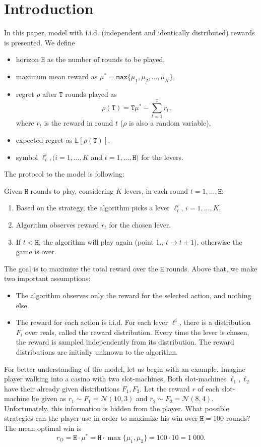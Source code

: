 \documentclass[11pt,american,czech]{article}
\newcommand{\T}{\mathtt{T}} %
\begin{document}
	\section*{Introduction}
	In this paper, model with i.i.d. (independent and identically distributed) rewards is presented. We define
	\begin{itemize}
		\item horizon $\mathtt{H}$ as the number of rounds to be played,
		\item maximum mean reward as $\mu^* = \mathtt{max}\{\mu_1,\mu_2,\dots,\mu_K\},$
		\item regret $\rho$ after $\T$ rounds played as
		$$\rho(\T) = \T\mu^* - \sum_{t=1}^{\T}r_t,$$
		where $r_t$ is the reward in round $t$ ($\rho$ is also a random variable),
		\item expected regret as $\mathbb{E}[\rho(\T)]$,
		\item symbol $\ell_t^i, (i=1,\dots,K$ and $ t=1,\dots,\mathtt{H})$ for the levers.
	\end{itemize}
	The protocol to the model is following:
	\begin{tcolorbox}[colframe=white]
		Given $\mathtt{H}$ rounds to play, considering $K$ levers, in each round $t=1,\dots,\mathtt{H}$:
		\begin{enumerate}
			\item Based on the strategy, the algorithm picks a lever $\ell_t^i$, $i=1,\dots,K$.
			\item Algorithm observes reward $r_t$ for the chosen lever.
			\item If $t<\mathtt{H}$, the algorithm will play again (point 1., $t\to t+1$), otherwise the game is over.
		\end{enumerate}
	\end{tcolorbox}
	The goal is to maximize the total reward over the $\mathtt{H}$ rounds. Above that, we make two important assumptions:
	\begin{itemize}
		\item The algorithm observes only the reward for the selected action, and nothing else.
		\item The reward for each action is  i.i.d. For each lever $\ell^i$, there is a distribution $F_{i}$ over reals, called the reward distribution. Every time the lever is chosen, the reward is sampled independently from its distribution. The reward distributions are initially unknown to the algorithm.
	\end{itemize}
	For better understanding of the model, let us begin with an example. Imagine player walking into a casino with two slot-machines. Both slot-machines $\ell_1,\ell_2$ have their already given distributions $F_1, F_2$. Let the reward $r$ of each slot-machine be given as $r_1\sim F_1=\mathcal{N}(10,3)$ and $r_2\sim F_2=\mathcal{N}(8,4)$. Unfortunately, this information is hidden from the player. What possible strategies can the player use in order to maximize his win over $\mathtt{H}=100$ rounds? The mean optimal win is $$r_O =\mathtt{H}\cdot \mu^* = \mathtt{H}\cdot \max\{\mu_1,\mu_2\} = 100\cdot10=1~000.$$
	
\end{document}
